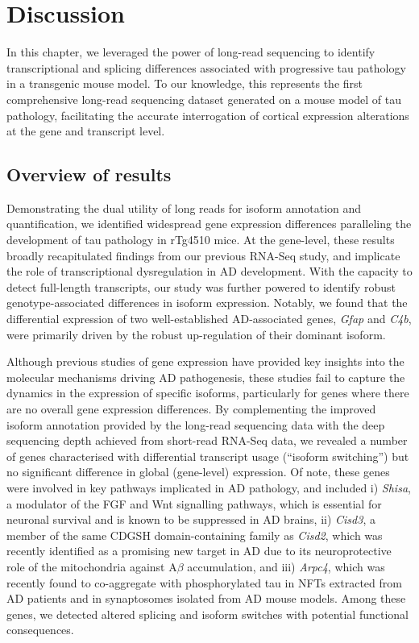 \clearpage
\section{Discussion}

In this chapter, we leveraged the power of long-read sequencing to identify transcriptional and splicing differences associated with progressive tau pathology in a transgenic mouse model. To our knowledge, this represents the first comprehensive long-read sequencing dataset generated on a mouse model of tau pathology, facilitating the accurate interrogation of cortical expression alterations at the gene and transcript level. 

\subsection{Overview of results}
Demonstrating the dual utility of long reads for isoform annotation and quantification, we identified widespread gene expression differences paralleling the development of tau pathology in rTg4510 mice. At the gene-level, these results broadly recapitulated findings from our previous RNA-Seq study\cite{Castanho2020}, and implicate the role of transcriptional dysregulation in AD development. With the capacity to detect full-length transcripts, our study was further powered to identify robust genotype-associated differences in isoform expression. Notably, we found that the differential expression of two well-established AD-associated genes, \textit{Gfap} and \textit{C4b}, were primarily driven by the robust up-regulation of their dominant isoform. 

Although previous studies of gene expression have provided key insights into the molecular mechanisms driving AD pathogenesis\cite{Castanho2020,Salih2019,Annese2018,Magistri2015}, these studies fail to capture the dynamics in the expression of specific isoforms, particularly for genes where there are no overall gene expression differences. By complementing the improved isoform annotation provided by the long-read sequencing data with the deep sequencing depth achieved from short-read RNA-Seq data, we revealed a number of genes characterised with differential transcript usage (“isoform switching”) but no significant difference in global (gene-level) expression. Of note, these genes were involved in key pathways implicated in AD pathology, and included i) \textit{Shisa}, a modulator of the FGF and Wnt signalling pathways, which is essential for neuronal survival and is known to be suppressed in AD brains\cite{Jia2019}, ii) \textit{Cisd3}, a member of the same CDGSH domain-containing family as \textit{Cisd2}, which was recently identified as a promising new target in AD due to its neuroprotective role of the mitochondria against A$\beta$ accumulation\cite{Chen2020}, and iii) \textit{Arpc4}, which was recently found to co-aggregate with phosphorylated tau in NFTs extracted from AD patients\cite{Drummond2020} and in synaptosomes isolated from AD mouse models\cite{Li2020a}. Among these genes, we detected altered splicing and isoform switches with potential functional consequences.  
  
